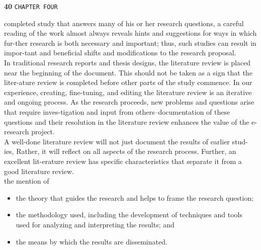 \documentclass{book}
\begin{document}
\begin{flushleft}
\textbf{40}\hspace*{1cm} \texttt{CHAPTER FOUR}
\end{flushleft}

\vspace*{0.5cm}

completed study that answers many of his or her research questions, a careful reading of the work almost always reveals hints and suggestions for ways in which fur-ther research is both necessary and important; thus, such studies can result in impor-tant and beneficial shifts and modifications to the research proposal.\\
\hspace*{0.5cm} In traditional research reports and thesis designs, the literature review is placed near the beginning of the document. This should not be taken as a sign that the liter-ature review is completed before other parts of the study commence. In our experience, creating, fine-tuning, and editing the literature review is an iterative and ongoing process. As the research proceeds, new problems and questions arise that require inves-tigation and input from others--documentation of these questions and their resolution in the literature review enhances the value of the e-research project.\\ 

\hspace{0.5cm} A well-done literature review will not just document the results of earlier stud-ies, Rather, it will reflect on all aspects of the research process. Further, an excellent lit-erature review has specific characteristics that separate it from a good literature review.\\
the mention of\\

\vspace*{0.2cm}
\begin{itemize}
  \item the theory that guides the research and helps to frame the research question;\\
  \item the methodology used, including the development of techniques and tools used for analyzing and interpreting the results; and\\
  \item the means by which the results are disseminated.\\
\end{itemize}
\end{document}

